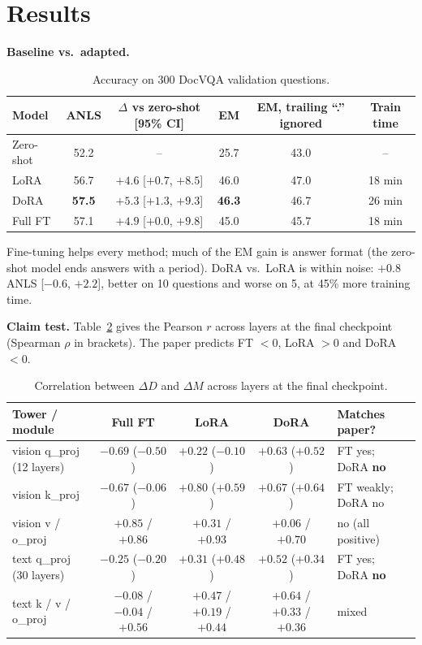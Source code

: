 \documentclass[10pt,a4paper]{article}
\newcommand{\dM}{\Delta M}
\newcommand{\dD}{\Delta D}
\begin{document}
\section{Results}
\textbf{Baseline vs.\ adapted.}
\begin{table}[!htbp]
  \centering\small
  \begin{tabular}{lccccc}
    \toprule
    Model & ANLS & $\Delta$ vs zero-shot [95\% CI] & EM & EM, trailing ``.'' ignored & Train time \\
    \midrule
    Zero-shot & 52.2 & --                      & 25.7 & 43.0 & -- \\
    LoRA      & 56.7 & $+4.6$ [$+0.7$, $+8.5$] & 46.0 & 47.0 & 18 min \\
    DoRA      & \textbf{57.5} & $\mathbf{+5.3}$ [$+1.3$, $+9.3$] & \textbf{46.3} & 46.7 & 26 min \\
    Full FT   & 57.1 & $+4.9$ [$+0.0$, $+9.8$] & 45.0 & 45.7 & 18 min \\
    \bottomrule
  \end{tabular}
  \caption{Accuracy on 300 DocVQA validation questions.}
  \label{tab:acc}
\end{table}

Fine-tuning helps every method; much of the EM gain is answer format (the zero-shot model ends answers with a period).
DoRA vs.\ LoRA is within noise: $+0.8$ ANLS [$-0.6$, $+2.2$], better on 10 questions and worse on 5, at 45\% more training time.

\textbf{Claim test.}
Table~\ref{tab:corr} gives the Pearson $r$ across layers at the final checkpoint (Spearman $\rho$ in brackets).
The paper predicts FT $<0$, LoRA $>0$ and DoRA $<0$.
\begin{table}[!htbp]
  \centering\small
  \begin{tabular}{lcccl}
    \toprule
    Tower / module & Full FT & LoRA & DoRA & Matches paper? \\
    \midrule
    vision q\_proj (12 layers) & $\mathbf{-0.69}$ ($-0.50$) & $+0.22$ ($-0.10$) & $+0.63$ ($+0.52$) & FT yes; DoRA \textbf{no} \\
    vision k\_proj             & $-0.67$ ($-0.06$) & $+0.80$ ($+0.59$) & $+0.67$ ($+0.64$) & FT weakly; DoRA no \\
    vision v / o\_proj         & $+0.85$ / $+0.86$ & $+0.31$ / $+0.93$ & $+0.06$ / $+0.70$ & no (all positive) \\
    text q\_proj (30 layers)   & $\mathbf{-0.25}$ ($-0.20$) & $+0.31$ ($+0.48$) & $+0.52$ ($+0.34$) & FT yes; DoRA \textbf{no} \\
    text k / v / o\_proj       & $-0.08$ / $-0.04$ / $+0.56$ & $+0.47$ / $+0.19$ / $+0.44$ & $+0.64$ / $+0.33$ / $+0.36$ & mixed \\
    \bottomrule
  \end{tabular}
  \caption{Correlation between $\dD$ and $\dM$ across layers at the final checkpoint.}
  \label{tab:corr}
\end{table}
\end{document}
